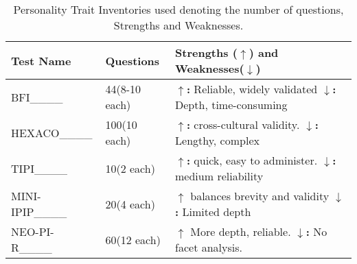 \begin{table}[h!]
\centering
\caption{Personality Trait Inventories used  denoting the number of questions, Strengths and Weaknesses.}
\small
\begin{tabular}{@{}llp{4.5cm}@{}}
\toprule
\textbf{Test Name} &  \textbf{Questions }& \textbf{Strengths ($\uparrow$) and Weaknesses($\downarrow$)} \\
\midrule
BFI____ & 44(8-10 each) & \textbf{$\uparrow$:} Reliable, widely validated \newline \textbf{$\downarrow$:} Depth, time-consuming \\
\hline
HEXACO____ & 100(10 each) & \textbf{$\uparrow$:} cross-cultural validity. \newline \textbf{$\downarrow$:} Lengthy, complex  \\
\hline
TIPI____ & 10(2 each) & \textbf{$\uparrow$:}  quick, easy to administer. \newline \textbf{$\downarrow$:} medium reliability \\
\hline
MINI-IPIP____ & 20(4 each) & \textbf{$\uparrow$}  balances brevity and validity \newline \textbf{$\downarrow$:} Limited depth \\
\hline
NEO-PI-R____ & 60(12 each) & \textbf{$\uparrow$} More depth, reliable. \newline \textbf{$\downarrow$:} No facet analysis. \\
\bottomrule
\end{tabular}
\label{tab:personality_tests}
\end{table}